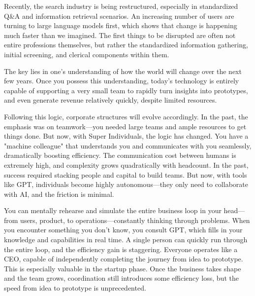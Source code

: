 {\vspace{1em}

Recently, the search industry is being restructured, especially in standardized Q\&A and information retrieval scenarios. An increasing number of users are turning to large language models first, which shows that change is happening much faster than we imagined. The first things to be disrupted are often not entire professions themselves, but rather the standardized information gathering, initial screening, and clerical components within them.

\vspace{1em}

The key lies in one's understanding of how the world will change over the next few years. Once you possess this understanding, today's technology is entirely capable of supporting a very small team to rapidly turn insights into prototypes, and even generate revenue relatively quickly, despite limited resources.

\vspace{1em}

Following this logic, corporate structures will evolve accordingly. In the past, the emphasis was on teamwork---you needed large teams and ample resources to get things done. But now, with Super Individuals, the logic has changed. You have a "machine colleague" that understands you and communicates with you seamlessly, dramatically boosting efficiency. The communication cost between humans is extremely high, and complexity grows quadratically with headcount. In the past, success required stacking people and capital to build teams. But now, with tools like GPT, individuals become highly autonomous---they only need to collaborate with AI, and the friction is minimal.

\vspace{1em}

You can mentally rehearse and simulate the entire business loop in your head---from users, product, to operations---constantly thinking through problems. When you encounter something you don't know, you consult GPT, which fills in your knowledge and capabilities in real time.
A single person can quickly run through the entire loop, and the efficiency gain is staggering. Everyone operates like a CEO, capable of independently completing the journey from idea to prototype. This is especially valuable in the startup phase. Once the business takes shape and the team grows, coordination still introduces some efficiency loss, but the speed from idea to prototype is unprecedented.

}
